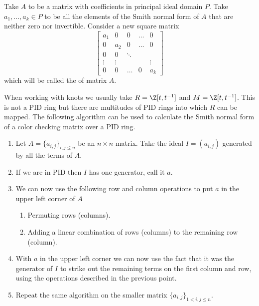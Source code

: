 \begin{definition}\label{reduced normal form def}
  Take $A$ to be a matrix with coefficients in principal ideal domain $P$. Take $a_1,...,a_k\in P$ to be all the elements of the Smith normal form of $A$ that are neither zero nor invertible. Consider a new square matrix 
  $$
  \begin{bmatrix}
    a_1 & 0 & 0 & \hdots & 0\\ 
    0 & a_2 & 0 & \hdots & 0 \\ 
    0 & 0 & \ddots & &  \\ 
    \vdots & \vdots & & & \vdots \\ 
    0 & 0 & \hdots & 0 & a_k
  \end{bmatrix}
  $$
  which will be called the  of matrix $A$.
\end{definition}

  When working with knots we usually take $R=\Z[t, t^{-1}]$ and $M=\Z[t, t^{-1}]$. This is not a PID ring but there are multitudes of PID rings into which $R$ can be mapped. The following algorithm can be used to calculate the Smith normal form of a color checking matrix over a PID ring.

  \begin{enumerate}
    \item Let $A=\{a_{i,j}\}_{i,j\leq n}$ be an $n\times n$ matrix. Take the ideal $I=(a_{i,j})$ generated by all the terms of $A$. 
    \item If we are in PID then $I$ has one generator, call it $a$.
    \item We can now use the following row and column operations to put $a$ in the upper left corner of $A$
      \begin{enumerate}
        \item Permuting rows (columns).
        \item Adding a linear combination of rows (columns) to the remaining row (column).
      \end{enumerate}
    \item With $a$ in the upper left corner we can now use the fact that it was the generator of $I$ to strike out the remaining terms on the first column and row, using the operations described in the previous point.
    \item Repeat the same algorithm on the smaller matrix  $\{a_{i,j}\}_{1<i, j\leq n}$.
  \end{enumerate}

